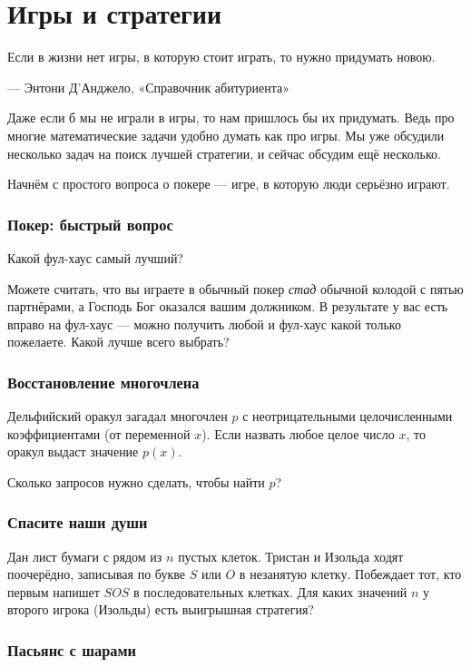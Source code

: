 \chapter{Игры и стратегии}

\setlength{\epigraphwidth}{.63\textwidth}
\epigraph{Если в жизни нет игры, в которую стоит играть, то нужно придумать новою. 
}{— Энтони Д'Анджело, «Справочник абитуриента»}

Даже если б мы не играли в игры, то нам пришлось бы их придумать.
Ведь про многие математические задачи удобно думать как про игры.
Мы уже обсудили несколько задач на поиск лучшей стратегии, и сейчас обсудим ещё несколько.

Начнём с простого вопроса о покере --- игре, в которую люди серьёзно играют.

\subsection*{Покер: быстрый вопрос}

Какой фул-хаус самый лучший?

Можете считать, что вы играете в обычный покер \emph{стад} обычной колодой с пятью партнёрами,
а Господь Бог оказался вашим должником.
В результате у вас есть вправо на фул-хаус --- можно получить любой и фул-хаус какой только пожелаете.
Какой лучше всего выбрать?

\subsection*{Восстановление многочлена}

Дельфийский оракул загадал многочлен $p$ с неотрицательными целочисленными коэффициентами (от переменной $x$).
Если назвать любое целое число $x$, то оракул выдаст значение $p(x)$.

Сколько запросов нужно сделать, чтобы найти $p$?

\subsection*{Спасите наши души}

Дан лист бумаги с рядом из $n$ пустых клеток.
Тристан и Изольда ходят поочерёдно, записывая по букве $S$ или $O$ в незанятую клетку.
Побеждает тот, кто первым напишет $SOS$ в последовательных клетках.
Для каких значений $n$ у второго игрока (Изольды) есть выигрышная стратегия?

\subsection*{Пасьянс с шарами}

